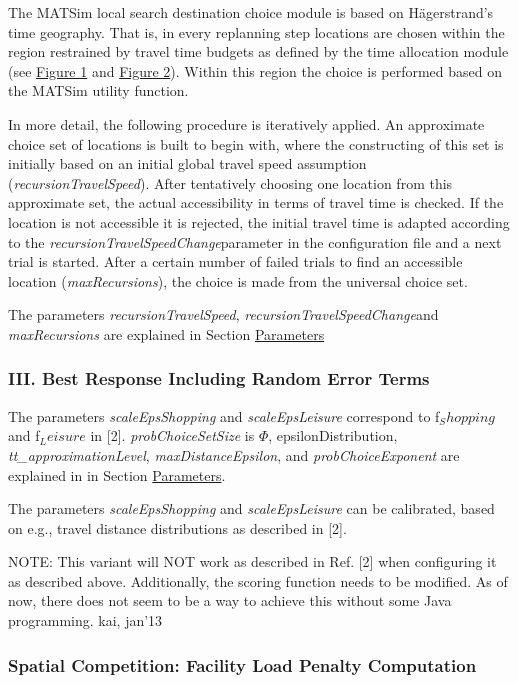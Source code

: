 The MATSim local search destination choice module is  based on Hägerstrand's time geography. That is, in every replanning step  locations are chosen within the region restrained by travel time  budgets as defined by the time allocation module (see \hyperlink{Figure1}{Figure 1} and \hyperlink{Figure2}{Figure 2}). Within this region the choice is performed based on the MATSim utility function.

In more detail, the following procedure is  iteratively applied. An approximate choice set of locations is built to  begin with, where the constructing of this set is initially based on an  initial global travel speed assumption (\emph{recursionTravelSpeed}).  After tentatively choosing one location from this approximate set, the  actual accessibility in terms of travel time is checked. If the location  is not accessible it is rejected, the initial travel time is adapted  according to the \emph{recursionTravelSpeedChange}parameter  in the configuration file and a next trial is started. After a certain  number of failed trials to find an accessible location (\emph{maxRecursions}), the choice is made from the universal choice set.

The parameters \emph{recursionTravelSpeed}, \emph{recursionTravelSpeedChange}and \emph{maxRecursions }are explained in Section \hyperlink{parameters}{Parameters}


\subsubsection{{III. Best Response Including Random Error Terms}}

The parameters \emph{scaleEpsShopping }and \emph{scaleEpsLeisure }correspond to f$_Shopping$ and f$_Leisure$ in [2]. \emph{probChoiceSetSize }is $\Phi$, epsilonDistribution, \emph{tt\_}\emph{approximationLevel}, \emph{maxDistanceEpsilon}, and \emph{probChoiceExponent }are explained in in Section \hyperlink{parameters}{Parameters}.

The parameters \emph{scaleEpsShopping }and \emph{scaleEpsLeisure }can be calibrated, based on e.g., travel distance distributions as described in [2].

NOTE: This  variant will NOT work as described in Ref. [2] when configuring it as  described above. Additionally, the scoring function needs to be  modified. As of now, there does not seem to be a way to achieve  this without some Java programming. kai, jan'13

\subsubsection{{Spatial Competition: Facility Load Penalty Computation}}

